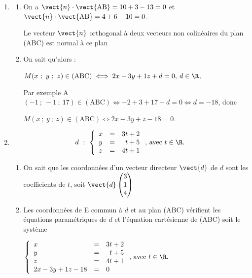\begin{enumerate}[resume]
	\item 
	\begin{enumerate}
		\item %
On a $\vect{n} \cdot \vect{\text{AB}} = 10  + 3 - 13 = 0$ et  $\vect{n} \cdot \vect{\text{AB}} = 4  + 6 - 10 = 0$.

Le vecteur $\vect{n}$ orthogonal à deux vecteurs non colinéaires du plan (ABC) est normal à ce plan
		\item %
On sait qu'alors :
		
$M(x~;~y~;~z) \in  (\text{ABC}) \iff 2x - 3y + 1z + d = 0, \: d \in \R$.
		
Par exemple A$(-1~;~-1~;~17)\in (\text{ABC}) \iff - 2 + 3 + 17 + d = 0 \iff d = -18$, donc 

$M(x~;~y~;~z) \in  (\text{ABC}) \iff 2x - 3y + z - 18 = 0$.
\end{enumerate}
	\item %

\[ d~:~\left\{\begin{array}{l c l}
x&=&3t+2\\y&=&\phantom{3}t+5\\z&=&4t+1\end{array}\right.\text{, avec } t \in \R. \]
	\begin{enumerate}
		\item %
On sait que les coordonnées d'un vecteur directeur $\vect{d}$ de $d$ sont les coefficients de $t$, soit $\vect{d}\begin{pmatrix}3\\1\\4\end{pmatrix}$
		\item %
		Les coordonnées de E commun à $d$ et au plan (ABC) vérifient les équations paramétriques de $d$ et l'équation cartésienne de (ABC) soit le système
		
		$\left\{\begin{array}{l c l}
x&=&3t+2\\y&=&\phantom{3}t+5\\z&=&4t+1\\
2x - 3y + 1z - 18 &=& 0
\end{array}\right.\text{, avec } t \in \R.$


\end{enumerate}
\end{enumerate}
